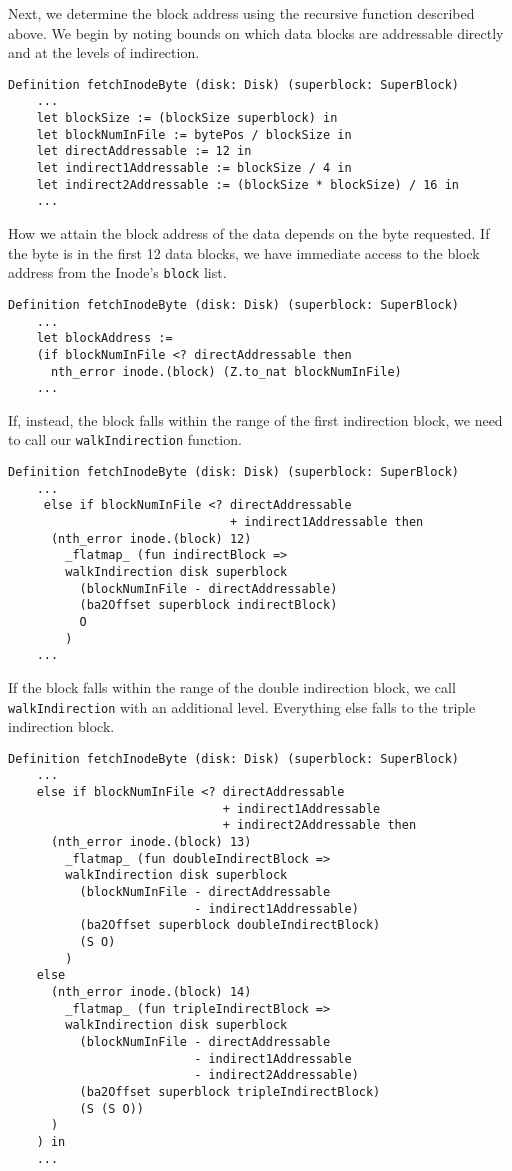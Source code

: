 \documentclass[nocopyrightspace]{sigplanconf}
\begin{document}
Next, we determine the block address using the recursive function described
above. We begin by noting bounds on which data blocks are addressable directly
and at the levels of indirection.

\begin{lstlisting}
Definition fetchInodeByte (disk: Disk) (superblock: SuperBlock)
    ...
    let blockSize := (blockSize superblock) in
    let blockNumInFile := bytePos / blockSize in
    let directAddressable := 12 in
    let indirect1Addressable := blockSize / 4 in
    let indirect2Addressable := (blockSize * blockSize) / 16 in
    ...
\end{lstlisting}

How we attain the block address of the data depends on the byte requested. If
the byte is in the first 12 data blocks, we have immediate access to the block
address from the Inode's {\tt block} list.

\begin{lstlisting}
Definition fetchInodeByte (disk: Disk) (superblock: SuperBlock)
    ...
    let blockAddress :=
    (if blockNumInFile <? directAddressable then
      nth_error inode.(block) (Z.to_nat blockNumInFile)
    ...
\end{lstlisting}

If, instead, the block falls within the range of the first indirection block,
we need to call our {\tt walkIndirection} function.

\begin{lstlisting}
Definition fetchInodeByte (disk: Disk) (superblock: SuperBlock)
    ...
     else if blockNumInFile <? directAddressable
                               + indirect1Addressable then
      (nth_error inode.(block) 12) 
        _flatmap_ (fun indirectBlock =>
        walkIndirection disk superblock
          (blockNumInFile - directAddressable)
          (ba2Offset superblock indirectBlock) 
          O
        )
    ...
\end{lstlisting}

If the block falls within the range of the double indirection block, we call
{\tt walkIndirection} with an additional level. Everything else falls to the
triple indirection block.

\begin{lstlisting}
Definition fetchInodeByte (disk: Disk) (superblock: SuperBlock)
    ...
    else if blockNumInFile <? directAddressable
                              + indirect1Addressable
                              + indirect2Addressable then
      (nth_error inode.(block) 13) 
        _flatmap_ (fun doubleIndirectBlock =>
        walkIndirection disk superblock 
          (blockNumInFile - directAddressable
                          - indirect1Addressable)
          (ba2Offset superblock doubleIndirectBlock)
          (S O)
        )
    else 
      (nth_error inode.(block) 14) 
        _flatmap_ (fun tripleIndirectBlock =>
        walkIndirection disk superblock 
          (blockNumInFile - directAddressable
                          - indirect1Addressable
                          - indirect2Addressable)
          (ba2Offset superblock tripleIndirectBlock) 
          (S (S O))
      )
    ) in
    ...
\end{lstlisting}
\end{document}
